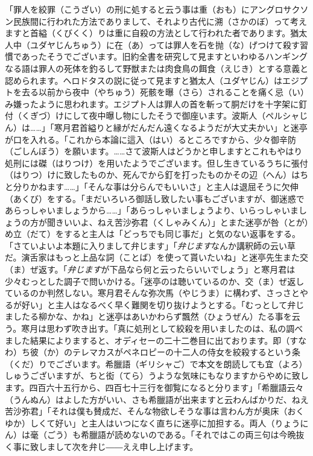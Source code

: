 \documentclass{book}
\begin{document}
「罪人を絞罪（こうざい）の刑に処すると云う事は重（おも）にアングロサクソン民族間に行われた方法でありまして、それより古代に溯（さかのぼ）って考えますと首縊（くびくく）りは重に自殺の方法として行われた者であります。猶太人中（ユダヤじんちゅう）に在（あ）っては罪人を石を抛（な）げつけて殺す習慣であったそうでございます。旧約全書を研究して見ますといわゆるハンギングなる語は罪人の死体を釣るして野獣または肉食鳥の餌食（えじき）とする意義と認められます。ヘロドタスの説に従って見ますと猶太人（ユダヤじん）はエジプトを去る以前から夜中（やちゅう）死骸を曝（さら）されることを痛く忌（い）み嫌ったように思われます。エジプト人は罪人の首を斬って胴だけを十字架に釘付（くぎづ）けにして夜中曝し物にしたそうで御座います。波斯人（ペルシャじん）は\ldots{}\ldots{}」「寒月君首縊りと縁がだんだん遠くなるようだが大丈夫かい」と迷亭が口を入れる。「これから本論に這入（はい）るところですから、少々御辛防（ごしんぼう）を願います。\ldots{}\ldots{}さて波斯人はどうかと申しますとこれもやはり処刑には磔（はりつけ）を用いたようでございます。但し生きているうちに張付（はりつ）けに致したものか、死んでから釘を打ったものかその辺（へん）はちと分りかねます\ldots{}\ldots{}」「そんな事は分らんでもいいさ」と主人は退屈そうに欠伸（あくび）をする。「まだいろいろ御話し致したい事もございますが、御迷惑であらっしゃいましょうから\ldots{}\ldots{}」「あらっしゃいましょうより、いらっしゃいましょうの方が聞きいいよ、ねえ苦沙弥君（くしゃみくん）」とまた迷亭が咎（とが）め立（だて）をすると主人は「どっちでも同じ事だ」と気のない返事をする。「さていよいよ本題に入りまして弁じます」「\emph{弁じます}なんか講釈師の云い草だ。演舌家はもっと上品な詞（ことば）を使って貰いたいね」と迷亭先生また交（ま）ぜ返す。「\emph{弁じます}が下品なら何と云ったらいいでしょう」と寒月君は少々むっとした調子で問いかける。「迷亭のは聴いているのか、交（ま）ぜ返しているのか判然しない。寒月君そんな弥次馬（やじうま）に構わず、さっさとやるが好い」と主人はなるべく早く難関を切り抜けようとする。「むっとして弁じましたる柳かな、かね」と迷亭はあいかわらず飄然（ひょうぜん）たる事を云う。寒月は思わず吹き出す。「真に処刑として絞殺を用いましたのは、私の調べました結果によりますると、オディセーの二十二巻目に出ております。即（すなわ）ち彼（か）のテレマカスがペネロピーの十二人の侍女を絞殺するという条（くだ）りでございます。希臘語（ギリシャご）で本文を朗読しても宜（よろ）しゅうございますが、ちと衒（てら）うような気味にもなりますからやめに致します。四百六十五行から、四百七十三行を御覧になると分ります」「希臘語云々（うんぬん）はよした方がいい、さも希臘語が出来ますと云わんばかりだ、ねえ苦沙弥君」「それは僕も賛成だ、そんな物欲しそうな事は言わん方が奥床（おくゆか）しくて好い」と主人はいつになく直ちに迷亭に加担する。両人（りょうにん）は毫（ごう）も希臘語が読めないのである。「それではこの両三句は今晩抜く事に致しまして次を弁じ――ええ申し上げます。\\
\end{document}
